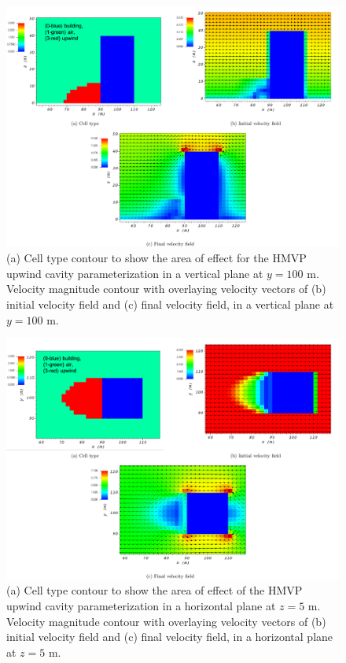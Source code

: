 \begin{figure}[H]
    \centering
    \includegraphics[width=\textwidth]{Images/upwind_y_100_3.pdf}
    \caption{(a) Cell type contour to show the area of effect for the HMVP upwind cavity parameterization in a vertical plane at $y=100$ m. Velocity magnitude contour with overlaying velocity vectors of (b) initial velocity field and (c) final velocity field, in a vertical plane at $y=100$ m.}
\end{figure}

\begin{figure}[H]
    \centering
    \includegraphics[width=\textwidth]{Images/upwind_z_5_3.pdf}
    \caption{(a) Cell type contour to show the area of effect of the HMVP upwind cavity parameterization in a horizontal plane at $z=5$ m. Velocity magnitude contour with overlaying velocity vectors of (b) initial velocity field and (c) final velocity field, in a horizontal plane at $z=5$ m.}
\end{figure}

